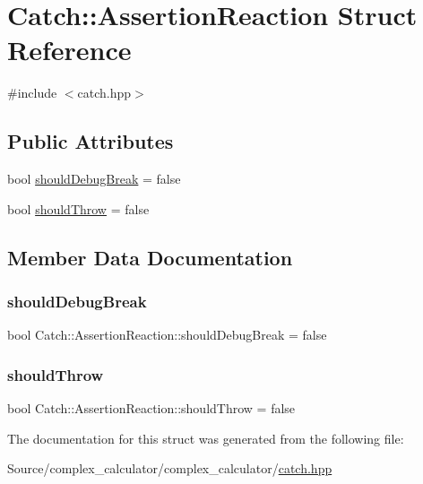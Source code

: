 \hypertarget{struct_catch_1_1_assertion_reaction}{}\section{Catch\+:\+:Assertion\+Reaction Struct Reference}
\label{struct_catch_1_1_assertion_reaction}


{\ttfamily \#include $<$catch.\+hpp$>$}

\subsection*{Public Attributes}
\begin{DoxyCompactItemize}
\item 
bool \mbox{\hyperlink{struct_catch_1_1_assertion_reaction_adcf30fb90ff20d9789df78d424652497}{should\+Debug\+Break}} = false
\item 
bool \mbox{\hyperlink{struct_catch_1_1_assertion_reaction_a82c8d95a2c1b6a331bde66982a8e090f}{should\+Throw}} = false
\end{DoxyCompactItemize}


\subsection{Member Data Documentation}
\mbox{\label{struct_catch_1_1_assertion_reaction_adcf30fb90ff20d9789df78d424652497}} 
\subsubsection{\texorpdfstring{should\+Debug\+Break}{shouldDebugBreak}}
{\footnotesize\ttfamily bool Catch\+::\+Assertion\+Reaction\+::should\+Debug\+Break = false}

\mbox{\label{struct_catch_1_1_assertion_reaction_a82c8d95a2c1b6a331bde66982a8e090f}} 
\subsubsection{\texorpdfstring{should\+Throw}{shouldThrow}}
{\footnotesize\ttfamily bool Catch\+::\+Assertion\+Reaction\+::should\+Throw = false}



The documentation for this struct was generated from the following file\+:\begin{DoxyCompactItemize}
\item 
Source/complex\+\_\+calculator/complex\+\_\+calculator/\mbox{\hyperlink{catch_8hpp}{catch.\+hpp}}\end{DoxyCompactItemize}
